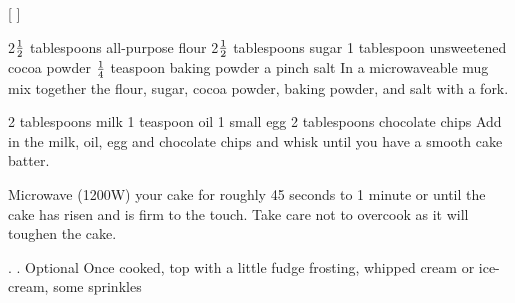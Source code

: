 
[
]

\begin{step}
2$\frac{1}{2}$ tablespoons all-purpose flour
2$\frac{1}{2}$ tablespoons sugar
1 tablespoon unsweetened cocoa powder
$\frac{1}{4}$ teaspoon baking powder
a pinch salt
\method
In a microwaveable mug mix together the flour, sugar, cocoa powder, baking powder, and salt with a fork.
\end{step}

\begin{step}
2 tablespoons milk
1 teaspoon oil
1 small egg
2 tablespoons chocolate chips
\method
Add in the milk, oil, egg and chocolate chips and whisk until you have a smooth cake batter. 

Microwave (1200W) your cake for roughly 45 seconds to 1 minute or until the cake has risen and is firm to the touch. Take care not to overcook as it will toughen the cake.
\end{step}

\begin{step}
. . Optional
\method
Once cooked, top with a little fudge frosting, whipped cream or ice-cream, some sprinkles

\end{step}